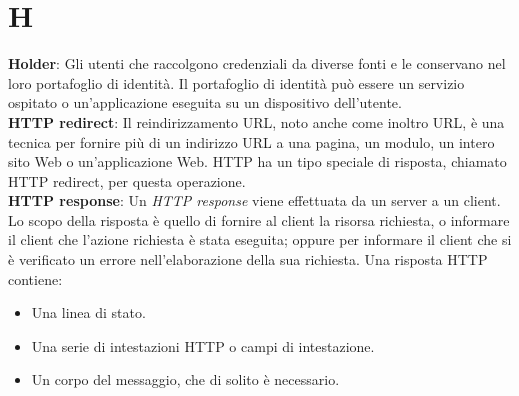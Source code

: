 \section*{H}
\textbf{Holder}: Gli utenti che raccolgono credenziali da diverse fonti e le conservano nel loro portafoglio di identità. Il portafoglio di identità può essere un servizio ospitato o un'applicazione eseguita su un dispositivo dell'utente.\\
\textbf{HTTP redirect}: Il reindirizzamento URL, noto anche come inoltro URL, è una tecnica per fornire più di un indirizzo URL a una pagina, un modulo, un intero sito Web o un'applicazione Web. 
HTTP ha un tipo speciale di risposta, chiamato HTTP redirect, per questa operazione.\\
\textbf{HTTP response}: Un\textit{ HTTP response} viene effettuata da un server a un client. Lo scopo della risposta è quello di fornire al client la risorsa richiesta,
o informare il client che l'azione richiesta è stata eseguita; oppure per informare il client che si è verificato un errore nell'elaborazione della sua richiesta.
Una risposta HTTP contiene:
\begin{itemize}
    \item Una linea di stato.
    \item Una serie di intestazioni HTTP o campi di intestazione.
    \item Un corpo del messaggio, che di solito è necessario.
\end{itemize}
